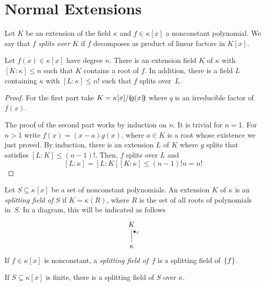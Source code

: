 \section{Normal Extensions}

\begin{defn}
    Let $K$ be an extension of the field $\kappa$ and $f\in\kappa[x]$ a nonconstant polynomial. We say that $f$ \textsl{splits over} $K$ if $f$ decomposes as product of linear factors in $K[x]$.
\end{defn}

\begin{thm}
    Let\/ $f(x)\in\kappa[x]$ have degree\/ $n$. There is an extension field\/ $K$ of\/ $\kappa$ with\/ $[K:\kappa]\le n$ such that\/ $K$ contains a root of\/ $f$. In addition, there is a field\/ $L$ containing\/ $\kappa$ with\/ $[L:\kappa]\le n!$ such that\/ $f$ splits over\/~$L$. 
\end{thm}

\begin{proof}
    For the first part take $K=\kappa[x]/\textrm{\boldmath$($}\!q(x)\!\textrm{\boldmath$)$}$ where $q$ is an irreducible factor of~$f(x)$.

    The proof of the second part works by induction on $n$. It is trivial for $n=1$. For $n>1$ write $f(x)=(x-a)g(x)$, where $a\in K$ is a root whose existence we just proved. By induction, there is an extension $L$ of $K$ where $g$ splits that satisfies $[L:K]\le(n-1)!$. Then, $f$ splits over $L$ and
    $$
        [L:\kappa]=[L:K][K:\kappa]\le(n-1)!n=n!
    $$
\end{proof}

\begin{defn}
    Let\/ $S\subseteq\kappa[x]$ be a set of nonconstant polynomials. An extension\/ $K$ of\/ $\kappa$ is an \textsl{splitting field of} $S$ if\/ $K=\kappa(R)$, where\/ $R$ is the set of all roots of polynomials in\/~$S$. In a diagram, this will be indicated as follows
    $$
        \begin{tikzcd}
            K\\
            \kappa
                    \arrow[u,"\sfld_S"',no head,pos=0.8]
        \end{tikzcd}
    $$
    If\/ $f\in\kappa[x]$ is nonconstant, a \textsl{splitting field of}~$f$ is a splitting field of\/~$\{f\}$.
\end{defn}

\begin{cor}
    If\/ $S\subseteq\kappa[x]$ is finite, there is a splitting field of\/ $S$ over\/ $\kappa$.
\end{cor}

